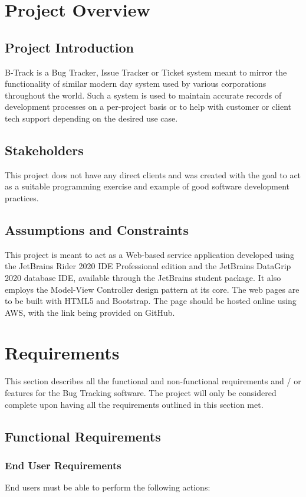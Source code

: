 \documentclass[openany, oneside,11pt]{book}
\begin{document}
\chapter{Project Overview}
\thispagestyle{fancy}
\section{Project Introduction}
B-Track is a Bug Tracker, Issue Tracker or Ticket system meant to mirror the functionality of similar modern day system used by various corporations throughout the world. Such a system is used to maintain accurate records of development processes on a per-project basis or to help with customer or client tech support depending on the desired use case. 
\section{Stakeholders}
This project does not have any direct clients and was created with the goal to act as a suitable programming exercise and example of good software development practices.
\section{Assumptions and Constraints}
This project is meant to act as a Web-based service application developed using the JetBrains Rider 2020 IDE Professional edition and the JetBrains DataGrip 2020 database IDE, available through the JetBrains student package. It also employs the Model-View Controller design pattern at its core. The web pages are to be built with HTML5 and Bootstrap. The page should be hosted online using AWS, with the link being provided on GitHub.

\chapter{Requirements}
\thispagestyle{fancy}
This section describes all the functional and non-functional requirements and / or features for the Bug Tracking software. The project will only be considered complete upon having all the requirements outlined in this section met.
\section{Functional Requirements}
\subsection{End User Requirements}
End users must be able to perform the following actions:

\end{document}
